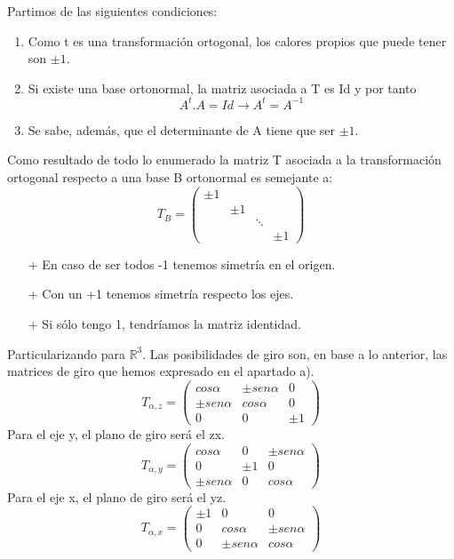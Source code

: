 \documentclass [a4paper,12pt]{article}
\begin{document}
Partimos de las siguientes condiciones:
\begin{enumerate}
\item Como t es una transformación ortogonal, los calores propios que puede tener son $\pm1$.
\item Si existe una base ortonormal, la matriz asociada a T es Id y por tanto $$A^t . A=Id\rightarrow A^t=A^{-1}$$
\item Se sabe, además, que el determinante de A tiene que ser $\pm1$.
\end{enumerate}
Como resultado de todo lo enumerado la matriz T asociada a la transformación ortogonal respecto a una base B ortonormal es semejante a:
$$
T_B=\begin{pmatrix}
\pm1& &\\
&\pm1&\\
&&\ddots\\
&&&\pm1
\end{pmatrix}
$$
\begin{itemize}
\item[+] En caso de ser todos -1 tenemos simetría en el origen.
\item[+] Con un +1 tenemos simetría respecto los ejes.
\item[+] Si sólo tengo 1, tendríamos la matriz identidad.
\end{itemize}
Particularizando para $\mathbb{R}^3$. Las posibilidades de giro son, en base a lo anterior, las matrices de giro que hemos expresado en el apartado a).
$$
T_{\alpha, z}=\begin{pmatrix}
cos \alpha&\pm sen \alpha &0\\
\pm sen \alpha&cos \alpha&0\\
0&0&\pm1
\end{pmatrix}
$$
Para el eje y, el plano de giro será el zx.
$$
T_{\alpha, y}=\begin{pmatrix}
cos \alpha&0 & \pm sen \alpha\\
0&\pm1&0\\
\pm sen \alpha&0&cos \alpha
\end{pmatrix}
$$
Para el eje x, el plano de giro será el yz.
$$
T_{\alpha, x}=\begin{pmatrix}
\pm1&0 &0\\
0&cos \alpha&\pm sen \alpha\\
0&\pm sen \alpha&cos \alpha
\end{pmatrix}
$$
\begin{flushleft}
\end{flushleft}
\end{document}

